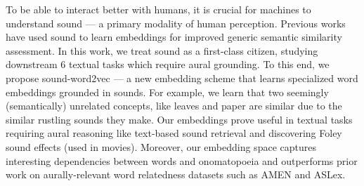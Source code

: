 To be able to interact better with humans, it is crucial for machines to understand sound --- a primary modality of human perception. Previous works have used sound to learn embeddings for improved generic semantic similarity assessment. In this work, we treat sound as a first-class citizen, studying downstream 6 textual tasks which require aural grounding. To this end, we propose sound-word2vec --- a new embedding scheme that learns specialized word embeddings grounded in sounds. For example, we learn that two seemingly (semantically) unrelated concepts, like leaves and paper are similar due to the similar rustling sounds they make. Our embeddings prove useful in textual tasks requiring aural reasoning like text-based sound retrieval and discovering Foley sound effects (used in movies). Moreover, our embedding space captures interesting dependencies between words and onomatopoeia and outperforms prior work on aurally-relevant word relatedness datasets such as AMEN and ASLex.
